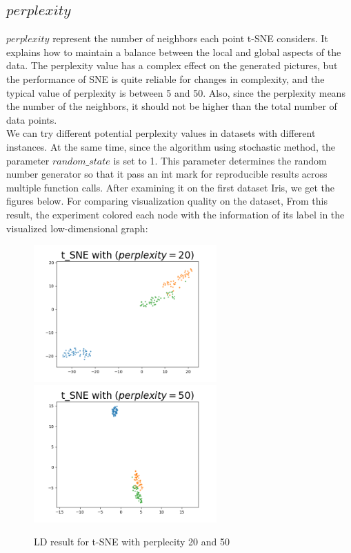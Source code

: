 \subsection{$perplexity$}

\noindent $perplexity$ represent the number of neighbors each point t-SNE considers. It explains how to maintain a balance between the local and global aspects of the data. The perplexity value has a complex effect on the generated pictures, but the performance of SNE is quite reliable for changes in complexity, and the typical value of perplexity is between 5 and 50\cite{ref9}. Also, since the perplexity means the number of the neighbors, it should not be higher than the total number of data points.\\

\noindent We can try different potential perplexity values in datasets with different instances. At the same time, since the algorithm using stochastic method, the parameter $random\_state$ is set to 1. This parameter determines the random number generator so that it pass an int mark for reproducible results across multiple function calls. After examining it on the first dataset Iris, we get the figures below. For comparing visualization quality on the dataset, From this result, the experiment colored each node with the information of its label in the visualized low-dimensional graph:

\begin{figure}[H]
\centering  %
{
\label{Fig.sub.1}
\includegraphics[width=7cm,height=3.5cm\textwidth]{images/image_comparison_tsne_perp20.png}}
{
\label{Fig.sub.2}
\includegraphics[width=7cm,height=3.5cm\textwidth]{images/image_comparison_tsne_perp50.png}}
\caption{LD result for t-SNE with perplecity 20 and 50}
\end{figure}

